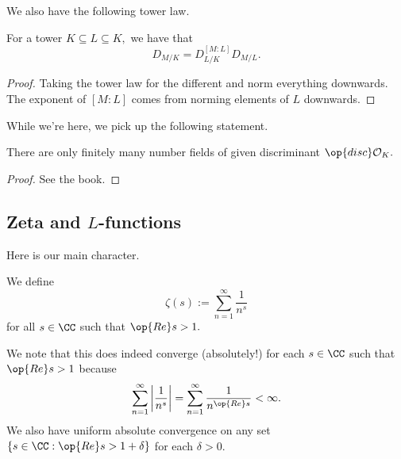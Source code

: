 We also have the following tower law.
\begin{proposition}
	For a tower $K\subseteq L\subseteq K,$ we have that
	\[D_{M/K}=D_{L/K}^{[M:L]}D_{M/L}.\]
\end{proposition}
\begin{proof}
	Taking the tower law for the different and norm everything downwards. The exponent of $[M:L]$ comes from {norm}ing elements of $L$ downwards.
\end{proof}
While we're here, we pick up the following statement.
\begin{theorem}
	There are only finitely many number fields of given discriminant $\op{disc}\mathcal O_K.$
\end{theorem}
\begin{proof}
	See the book.
\end{proof}

\subsection{Zeta and \texorpdfstring{$L$}{L}-functions}
Here is our main character.
\begin{definition}
	We define
	\[\zeta(s):=\sum_{n=1}^\infty\frac1{n^s}\]
	for all $s\in\CC$ such that $\op{Re}s>1.$
\end{definition}
We note that this does indeed converge (absolutely!) for each $s\in\CC$ such that $\op{Re}s>1$ because
\[\sum_{n=1}^\infty\left|\frac1{n^s}\right|=\sum_{n=1}^\infty\frac1{n^{\op{Re}s}}<\infty.\]
We also have uniform absolute convergence on any set $\{s\in\CC:\op{Re}s>1+\delta\}$ for each $\delta>0.$

